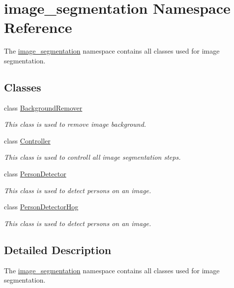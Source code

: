 \hypertarget{namespaceimage__segmentation}{}\section{image\+\_\+segmentation Namespace Reference}
\label{namespaceimage__segmentation}


The \mbox{\hyperlink{namespaceimage__segmentation}{image\+\_\+segmentation}} namespace contains all classes used for image segmentation.  


\subsection*{Classes}
\begin{DoxyCompactItemize}
\item 
class \mbox{\hyperlink{classimage__segmentation_1_1_background_remover}{Background\+Remover}}
\begin{DoxyCompactList}\small\item\em This class is used to remove image background. \end{DoxyCompactList}\item 
class \mbox{\hyperlink{classimage__segmentation_1_1_controller}{Controller}}
\begin{DoxyCompactList}\small\item\em This class is used to controll all image segmentation steps. \end{DoxyCompactList}\item 
class \mbox{\hyperlink{classimage__segmentation_1_1_person_detector}{Person\+Detector}}
\begin{DoxyCompactList}\small\item\em This class is used to detect persons on an image. \end{DoxyCompactList}\item 
class \mbox{\hyperlink{classimage__segmentation_1_1_person_detector_hog}{Person\+Detector\+Hog}}
\begin{DoxyCompactList}\small\item\em This class is used to detect persons on an image. \end{DoxyCompactList}\end{DoxyCompactItemize}


\subsection{Detailed Description}
The \mbox{\hyperlink{namespaceimage__segmentation}{image\+\_\+segmentation}} namespace contains all classes used for image segmentation. 